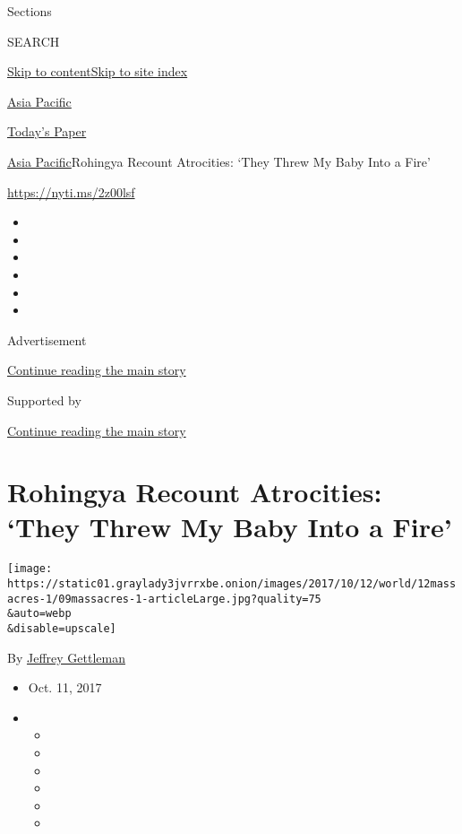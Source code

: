Sections

SEARCH

\protect\hyperlink{site-content}{Skip to
content}\protect\hyperlink{site-index}{Skip to site index}

\href{https://www.nytimes3xbfgragh.onion/section/world/asia}{Asia
Pacific}

\href{https://myaccount.nytimes3xbfgragh.onion/auth/login?response_type=cookie\&client_id=vi}{}

\href{https://www.nytimes3xbfgragh.onion/section/todayspaper}{Today's
Paper}

\href{/section/world/asia}{Asia Pacific}\textbar{}Rohingya Recount
Atrocities: `They Threw My Baby Into a Fire'

\url{https://nyti.ms/2z00lsf}

\begin{itemize}
\item
\item
\item
\item
\item
\item
\end{itemize}

Advertisement

\protect\hyperlink{after-top}{Continue reading the main story}

Supported by

\protect\hyperlink{after-sponsor}{Continue reading the main story}

\hypertarget{rohingya-recount-atrocities-they-threw-my-baby-into-a-fire}{%
\section{Rohingya Recount Atrocities: `They Threw My Baby Into a
Fire'}\label{rohingya-recount-atrocities-they-threw-my-baby-into-a-fire}}

\texttt{[image: https://static01.graylady3jvrrxbe.onion/images/2017/10/12/world/12massacres-1/09massacres-1-articleLarge.jpg?quality=75\\\&auto=webp\\\&disable=upscale]}

By \href{http://www.nytimes3xbfgragh.onion/by/jeffrey-gettleman}{Jeffrey
Gettleman}

\begin{itemize}
\item
  Oct. 11, 2017
\item
  \begin{itemize}
  \item
  \item
  \item
  \item
  \item
  \item
  \end{itemize}
\end{itemize}

